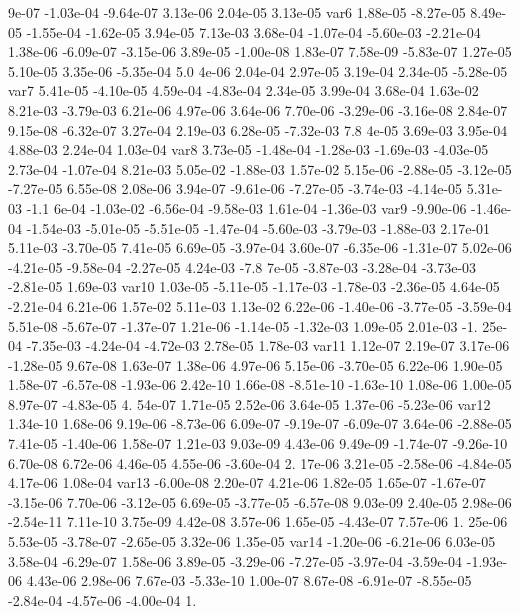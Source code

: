 9e-07 -1.03e-04 -9.64e-07  3.13e-06  2.04e-05  3.13e-05
var6  1.88e-05 -8.27e-05  8.49e-05 -1.55e-04 -1.62e-05  3.94e-05  7.13e-03  3.68e-04 -1.07e-04 -5.60e-03 -2.21e-04  1.38e-06 -6.09e-07 -3.15e-06  3.89e-05 -1.00e-08  1.83e-07  7.58e-09 -5.83e-07  1.27e-05  5.10e-05  3.35e-06 -5.35e-04  5.0
4e-06  2.04e-04  2.97e-05  3.19e-04  2.34e-05 -5.28e-05
var7  5.41e-05 -4.10e-05  4.59e-04 -4.83e-04  2.34e-05  3.99e-04  3.68e-04  1.63e-02  8.21e-03 -3.79e-03  6.21e-06  4.97e-06  3.64e-06  7.70e-06 -3.29e-06 -3.16e-08  2.84e-07  9.15e-08 -6.32e-07  3.27e-04  2.19e-03  6.28e-05 -7.32e-03  7.8
4e-05  3.69e-03  3.95e-04  4.88e-03  2.24e-04  1.03e-04
var8  3.73e-05 -1.48e-04 -1.28e-03 -1.69e-03 -4.03e-05  2.73e-04 -1.07e-04  8.21e-03  5.05e-02 -1.88e-03  1.57e-02  5.15e-06 -2.88e-05 -3.12e-05 -7.27e-05  6.55e-08  2.08e-06  3.94e-07 -9.61e-06 -7.27e-05 -3.74e-03 -4.14e-05  5.31e-03 -1.1
6e-04 -1.03e-02 -6.56e-04 -9.58e-03  1.61e-04 -1.36e-03
var9 -9.90e-06 -1.46e-04 -1.54e-03 -5.01e-05 -5.51e-05 -1.47e-04 -5.60e-03 -3.79e-03 -1.88e-03  2.17e-01  5.11e-03 -3.70e-05  7.41e-05  6.69e-05 -3.97e-04  3.60e-07 -6.35e-06 -1.31e-07  5.02e-06 -4.21e-05 -9.58e-04 -2.27e-05  4.24e-03 -7.8
7e-05 -3.87e-03 -3.28e-04 -3.73e-03 -2.81e-05  1.69e-03
var10  1.03e-05 -5.11e-05 -1.17e-03 -1.78e-03 -2.36e-05  4.64e-05 -2.21e-04  6.21e-06  1.57e-02  5.11e-03  1.13e-02  6.22e-06 -1.40e-06 -3.77e-05 -3.59e-04  5.51e-08 -5.67e-07 -1.37e-07  1.21e-06 -1.14e-05 -1.32e-03  1.09e-05  2.01e-03 -1.
25e-04 -7.35e-03 -4.24e-04 -4.72e-03  2.78e-05  1.78e-03
var11  1.12e-07  2.19e-07  3.17e-06 -1.28e-05  9.67e-08  1.63e-07  1.38e-06  4.97e-06  5.15e-06 -3.70e-05  6.22e-06  1.90e-05  1.58e-07 -6.57e-08 -1.93e-06  2.42e-10  1.66e-08 -8.51e-10 -1.63e-10  1.08e-06  1.00e-05  8.97e-07 -4.83e-05  4.
54e-07  1.71e-05  2.52e-06  3.64e-05  1.37e-06 -5.23e-06
var12  1.34e-10  1.68e-06  9.19e-06 -8.73e-06  6.09e-07 -9.19e-07 -6.09e-07  3.64e-06 -2.88e-05  7.41e-05 -1.40e-06  1.58e-07  1.21e-03  9.03e-09  4.43e-06  9.49e-09 -1.74e-07 -9.26e-10  6.70e-08  6.72e-06  4.46e-05  4.55e-06 -3.60e-04  2.
17e-06  3.21e-05 -2.58e-06 -4.84e-05  4.17e-06  1.08e-04
var13 -6.00e-08  2.20e-07  4.21e-06  1.82e-05  1.65e-07 -1.67e-07 -3.15e-06  7.70e-06 -3.12e-05  6.69e-05 -3.77e-05 -6.57e-08  9.03e-09  2.40e-05  2.98e-06 -2.54e-11  7.11e-10  3.75e-09  4.42e-08  3.57e-06  1.65e-05 -4.43e-07  7.57e-06  1.
25e-06  5.53e-05 -3.78e-07 -2.65e-05  3.32e-06  1.35e-05
var14 -1.20e-06 -6.21e-06  6.03e-05  3.58e-04 -6.29e-07  1.58e-06  3.89e-05 -3.29e-06 -7.27e-05 -3.97e-04 -3.59e-04 -1.93e-06  4.43e-06  2.98e-06  7.67e-03 -5.33e-10  1.00e-07  8.67e-08 -6.91e-07 -8.55e-05 -2.84e-04 -4.57e-06 -4.00e-04  1.
